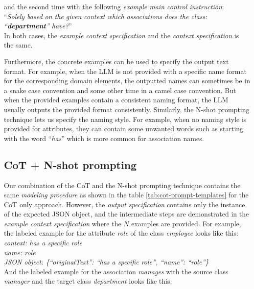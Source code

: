 \noindent{}and the second time with the following \emph{example main control instruction}: \\

\noindent{}``\textit{Solely based on the given context which associations does the class: ``\textbf{department}'' have?}'' \\

\noindent{}In both cases, the \emph{example context specification} and the \emph{context specification} is the same.

Furthermore, the concrete examples can be used to specify the output text format. For example, when the LLM is not provided with a specific name format for the corresponding domain elements, the outputted names can sometimes be in a snake case convention and some other time in a camel case convention. But when the provided examples contain a consistent naming format, the LLM usually outputs the provided format consistently. Similarly, the N-shot prompting technique lets us specify the naming style. For example, when no naming style is provided for attributes, they can contain some unwanted words such as starting with the word ``\textit{has}'' which is more common for association names.


\subsection{CoT + N-shot prompting}

Our combination of the CoT and the N-shot prompting technique contains the same \emph{modeling procedure} as shown in the table \ref{tab:cot-prompt-templates} for the CoT only approach. However, the \emph{output specification} contains only the instance of the expected JSON object, and the intermediate steps are demonstrated in the \emph{example context specification} where the $N$ examples are provided. For example, the labeled example for the attribute \textit{role} of the class \textit{employee} looks like this: \\

\noindent{}\textit{context: has a specific role} \\
\textit{name: role} \\
\textit{JSON object: \{``originalText'': ``has a specific role'', ``name'': ``role''\}} \\

\noindent{}And the labeled example for the association \textit{manages} with the source class \textit{manager} and the target class \textit{department} looks like this: \\

